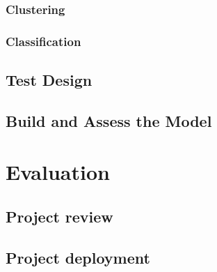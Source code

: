 \subsubsection*{Clustering}

\subsubsection*{Classification}

\subsection*{Test Design}

\subsection*{Build and Assess the Model}


\section*{Evaluation}

\subsection*{Project review}

\subsection*{Project deployment}


